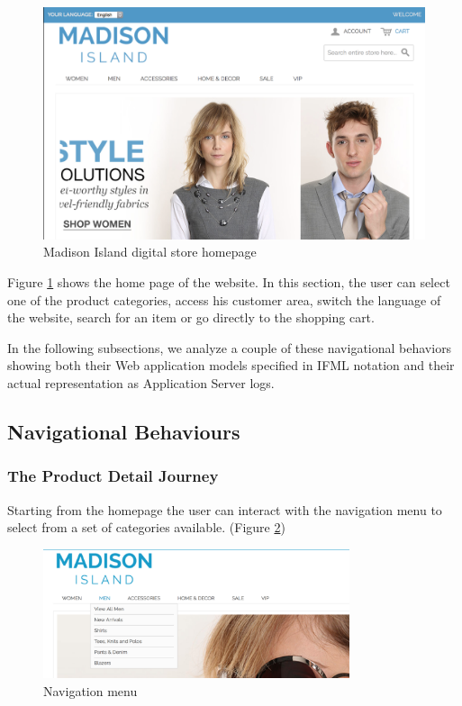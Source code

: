 \vspace{0.1cm}
\begin{figure}[htbp]
  \centering
    \includegraphics[width=12cm]{images/home.png}
  \caption{Madison Island digital store homepage}
  \label{fig:home}
\end{figure}
\vspace{0.1cm}


Figure \ref{fig:home} shows the home page of the website. In this section, the user can select one of the product categories, access his customer area, switch the language of the website, search for an item or go directly to the shopping cart. 

In the following subsections, we analyze a couple of these navigational behaviors showing both their Web application models specified in IFML notation and their actual representation as Application Server logs.

\subsection{Navigational Behaviours}

\subsubsection{The Product Detail Journey}

Starting from the homepage the user can interact with the navigation menu to select from a set of categories available.  (Figure \ref{fig:navigation})

\vspace{0.1cm}
\begin{figure}[htbp]
  \centering
    \includegraphics[width=9cm]{images/madison/navigation.png}
  \caption{Navigation menu}
  \label{fig:navigation}
\end{figure}
\vspace{0.1cm}

